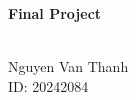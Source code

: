 \documentclass[10pt,a4paper]{extarticle}
\numberwithin{equation}{section}
\begin{document}
\begin{center}
\begin{Large}
    \textbf{Final Project}
\end{Large}
\\
Nguyen Van Thanh\\
ID: 20242084
\end{center}


\newpage

\
\end{document}
